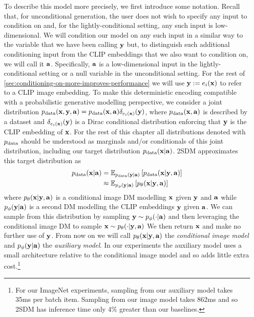 To describe this model more precisely, we first introduce some notation. Recall that, for unconditional generation, the user does not wish to specify any input to condition on and, for the lightly-conditional setting, any such input is low-dimensional. We will condition our model on any such input in a similar way to the variable that we have been calling ${\mathbf{y}}$ but, to distinguish such additional conditioning input from the CLIP embeddings that we also want to condition on, we will call it ${\mathbf{a}}$. Specifically, ${\mathbf{a}}$ is a low-dimensional input in the lightly-conditional setting or a null variable in the unconditional setting. For the rest of \cref{sec:conditioning-on-more-improves-performance} we will use ${\mathbf{y}} := e_i({\mathbf{x}})$ to refer to a CLIP image embedding. To make this deterministic encoding compatible with a probabilistic generative modelling perspective, we consider a joint distribution $p_{\rm{data}}({\mathbf{x}}, {\mathbf{y}}, {\mathbf{a}})=p_{\rm{data}}({\mathbf{x}}, {\mathbf{a}})\delta_{e_i({\mathbf{x}})}({\mathbf{y}})$, where $p_{\rm{data}}({\mathbf{x}}, {\mathbf{a}})$ is described by a dataset and $\delta_{e_i({\mathbf{x}})}({\mathbf{y}})$ is a Dirac conditional distribution enforcing that ${\mathbf{y}}$ is the CLIP embedding of ${\mathbf{x}}$. For the rest of this chapter all distributions denoted with $p_{\rm{data}}$ should be understood as marginals and/or conditionals of this joint distribution, including our target distribution $p_{\rm{data}}({\mathbf{x}}|{\mathbf{a}})$. 2SDM approximates this target distribution as
%
\begin{align} \label{eq:no-a}
    \pdata(\rvx|\rva) &= \mathbb{E}_{\pdata(\rvy|\rva)} \left[ \pdata(\rvx|\rvy,\rva) \right] \\
    &\approx \mathbb{E}_{p_\phi(\rvy|\rva)} \left[ p_\theta(\rvx|\rvy,\rva) \right] %
\end{align}
where $p_\theta({\mathbf{x}}|{\mathbf{y}},{\mathbf{a}})$ is a conditional image DM modelling ${\mathbf{x}}$ given ${\mathbf{y}}$ and ${\mathbf{a}}$ while $p_\phi({\mathbf{y}}|{\mathbf{a}})$ is a second DM modelling the CLIP embeddings ${\mathbf{y}}$ given ${\mathbf{a}}$. We can sample from this distribution by sampling ${\mathbf{y}}\sim p_\phi(\cdot|{\mathbf{a}})$ and then leveraging the conditional image DM to sample ${\mathbf{x}} \sim p_\theta(\cdot|{\mathbf{y}},{\mathbf{a}})$ We then return ${\mathbf{x}}$ and make no further use of ${\mathbf{y}}$.
%
From now on we will call $p_\theta({\mathbf{x}}|{\mathbf{y}},{\mathbf{a}})$ the \textit{conditional image model} and $p_\phi({\mathbf{y}}|{\mathbf{a}})$ the \textit{auxiliary model}. In our experiments the auxiliary model uses a small architecture relative to the conditional image model and so adds little extra cost.\footnote{For our ImageNet experiments, sampling from our auxiliary model takes 35ms per batch item. Sampling from our image model takes 862ms and so 2SDM has inference time only $4\%$ greater than our baselines.}


